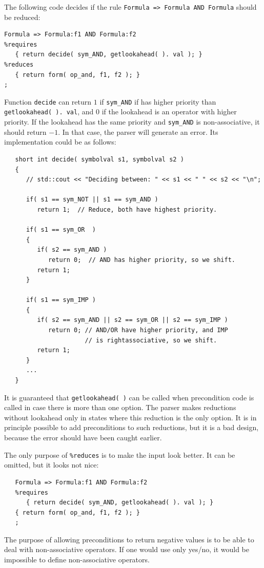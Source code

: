 \documentclass{article}
\begin{document}
The following code decides if the rule 
\verb+Formula => Formula AND Formula+ should be reduced:

\begin{verbatim}
Formula => Formula:f1 AND Formula:f2
%requires
   { return decide( sym_AND, getlookahead( ). val ); }
%reduces
   { return form( op_and, f1, f2 ); } 
; \end{verbatim}
Function \verb+decide+ can return $1$ if \verb+sym_AND+ if has
higher priority than \\ \verb+getlookahead( ). val+,
and $0$ if the lookahead
is an operator with higher priority. If the lookahead has the same priority
and \verb+sym_AND+ is non-associative, it should return $ -1. $ 
In that case, the parser will generate an error. 
Its implementation could be as follows:
\begin{verbatim}
   short int decide( symbolval s1, symbolval s2 )
   {
      // std::cout << "Deciding between: " << s1 << " " << s2 << "\n";

      if( s1 == sym_NOT || s1 == sym_AND ) 
         return 1;  // Reduce, both have highest priority.

      if( s1 == sym_OR  )
      {
         if( s2 == sym_AND )
            return 0;  // AND has higher priority, so we shift.
         return 1;  
      }

      if( s1 == sym_IMP )
      {
         if( s2 == sym_AND || s2 == sym_OR || s2 == sym_IMP )
            return 0; // AND/OR have higher priority, and IMP 
                      // is rightassociative, so we shift.
         return 1;
      }
      ...  
   } \end{verbatim}
It is guaranteed that \verb+getlookahead( )+
can be called when precondition code is called in case there is more
than one option.  
The parser makes reductions without lookahead only in states 
where this reduction is the only option. 
It is in principle possible to add preconditions to such reductions,
but it is a bad design, because the error should have been caught earlier.

The only purpose of \verb+%reduces+ is to make the input look better.
It can be omitted, but it looks not nice: 
\begin{verbatim}
   Formula => Formula:f1 AND Formula:f2
   %requires
      { return decide( sym_AND, getlookahead( ). val ); }
   { return form( op_and, f1, f2 ); }
   ; \end{verbatim}

\noindent
The purpose of allowing preconditions to return
negative values is to be able to deal with non-associative operators. 
If one would use only yes/no, it would be impossible to 
define non-associative operators.
\end{document}
